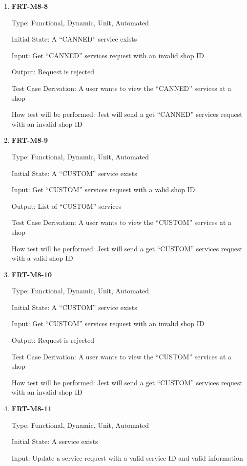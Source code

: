 \documentclass[12pt, titlepage]{article}
\begin{document}
\begin{enumerate}
	\item \textbf{FRT-M8-8}

	      Type: Functional, Dynamic, Unit, Automated

	      Initial State: A ``CANNED'' service exists

	      Input: Get ``CANNED'' services request with an invalid shop ID

	      Output: Request is rejected

	      Test Case Derivation: A user wants to view the ``CANNED'' services at a shop

	      How test will be performed: Jest will send a get ``CANNED'' services request with an invalid shop
	      ID

	\item \textbf{FRT-M8-9}

	      Type: Functional, Dynamic, Unit, Automated

	      Initial State: A ``CUSTOM'' service exists

	      Input: Get ``CUSTOM'' services request with a valid shop ID

	      Output: List of ``CUSTOM'' services

	      Test Case Derivation: A user wants to view the ``CUSTOM'' services at a shop

	      How test will be performed: Jest will send a get ``CUSTOM'' services request with a valid shop ID

	\item \textbf{FRT-M8-10}

	      Type: Functional, Dynamic, Unit, Automated

	      Initial State: A ``CUSTOM'' service exists

	      Input: Get ``CUSTOM'' services request with an invalid shop ID

	      Output: Request is rejected

	      Test Case Derivation: A user wants to view the ``CUSTOM'' services at a shop

	      How test will be performed: Jest will send a get ``CUSTOM'' services request with an invalid shop
	      ID

	\item \textbf{FRT-M8-11}

	      Type: Functional, Dynamic, Unit, Automated

	      Initial State: A service exists

	      Input: Update a service request with a valid service ID and valid information


\end{enumerate}
\end{document}
